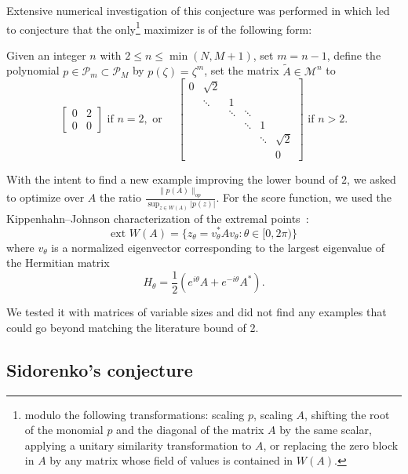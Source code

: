 Extensive numerical investigation of this conjecture was performed in \cite{greenbaum2017,greenbaum2018} which led to conjecture that the only\footnote{modulo the following transformations: scaling $p$, scaling $A$, shifting the
root of the monomial $p$ and the diagonal of the matrix $A$ by the same scalar, applying a unitary similarity
transformation to $A$, or replacing the zero block in $A$ by any matrix whose field of values is contained in
$W(A)$.} maximizer is of the following form:

Given an integer $n$ with $2 \leq n \leq \min(N, M + 1)$, set $m = n - 1$, define the polynomial $p \in \mathcal{P}_m \subset \mathcal{P}_M$ by $p(\zeta) = \zeta^m$, set the matrix $\tilde{A} \in \mathcal{M}^n$ to
\begin{equation}
\begin{bmatrix}
0 & 2 \\
0 & 0
\end{bmatrix} \text{ if } n = 2, \text{ or } \quad
\begin{bmatrix}
0 & \sqrt{2} & & & \\
& \ddots & 1 & & \\
& & \ddots & \ddots & \\
& & & \ddots & 1 \\
& & & & \ddots & \sqrt{2} \\
& & & & & 0
\end{bmatrix} \text{ if } n > 2.
\end{equation}


With the intent to find a new example improving the lower bound of $2$, we asked \AlphaEvolve to optimize over $A$ the ratio $\displaystyle \frac{\|p(A)\|_{op}}{\sup_{z \in W(A)} |p(z)|}$. For the score function, we used  the Kippenhahn--Johnson characterization of the extremal points~\cite{greenbaum2014investigation}:
\[
\text{ext } W(A) = \{z_\theta = v_\theta^* A v_\theta : \theta \in [0, 2\pi)\}
\]
where $v_\theta$ is a normalized eigenvector corresponding to the largest eigenvalue of the Hermitian matrix
\[
H_\theta = \frac{1}{2}\left(e^{i\theta} A + e^{-i\theta} A^*\right).
\]

We tested it with matrices of variable sizes and did not find any examples that could go beyond matching the literature bound of 2.



\subsection{Sidorenko's conjecture}

